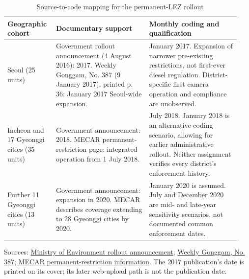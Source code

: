 \begin{table}[htbp]
\centering
\caption{Source-to-code mapping for the permanent-LEZ rollout}
\label{tab:s_policy_dates}
\singlespacing\footnotesize
\setlength{\tabcolsep}{4pt}
\begin{tabular}{@{}>{\raggedright\arraybackslash}p{0.19\linewidth}>{\raggedright\arraybackslash}p{0.38\linewidth}>{\raggedright\arraybackslash}p{0.37\linewidth}@{}}
\toprule
Geographic cohort & Documentary support & Monthly coding and qualification\\
\midrule
Seoul (25 units) & Government rollout announcement (4 August 2016): 2017. Weekly Gonggam, No. 387 (9 January 2017), printed p. 36: January 2017 Seoul-wide expansion. & January 2017. Expansion of narrower pre-existing restrictions, not first-ever diesel regulation. District-specific first camera operation and compliance are unobserved.\\[3pt]
Incheon and 17 Gyeonggi cities (35 units) & Government announcement: 2018. MECAR permanent-restriction page: integrated operation from 1 July 2018. & July 2018. January 2018 is an alternative coding scenario, allowing for earlier administrative rollout. Neither assignment verifies every district's enforcement history.\\[3pt]
Further 11 Gyeonggi cities (13 units) & Government announcement: expansion in 2020. MECAR describes coverage extending to 28 Gyeonggi cities by 2020. & January 2020 is assumed. July and December 2020 are mid- and late-year sensitivity scenarios, not documented common enforcement dates.\\
\bottomrule
\end{tabular}
\begin{flushleft}\footnotesize
Sources: \href{https://www.korea.kr/news/policyNewsView.do?newsId=148819495}{Ministry of Environment rollout announcement}; \href{https://www.korea.kr/goNewsRes/attaches/2019.05/23/107_20170109_01IozeNoYDGJM000.pdf}{Weekly Gonggam, No. 387}; \href{https://www.mecar.or.kr/dr/info/oldDieselCarAlwaysDr.do}{MECAR permanent-restriction information}. The 2017 publication's date is printed on its cover; its later web-upload path is not the publication date.
\end{flushleft}
\end{table}
